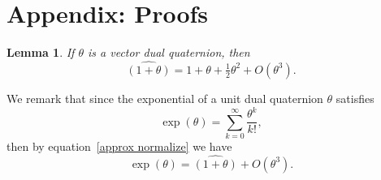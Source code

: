\documentclass[reqno,12pt]{amsart}
\newtheorem{lemma}{Lemma}
\begin{document}
\section{Appendix: Proofs}
\label{sec proofs}

\begin{lemma} 
\label{lemma approx normalize}
If $\theta$ is a vector dual quaternion, then
\begin{equation}
\label{approx normalize}
\widehat {(1+\theta)} = 1 + \theta + \tfrac12 \theta^2 + O(\theta^3).
\end{equation}
\end{lemma}

We remark that since the exponential of a unit dual quaternion $\theta$ \cite{wang-et-al} satisfies
\begin{equation}
\label{exponential}
\exp(\theta) = \sum_{k=0}^\infty \frac{\theta^k}{k!},
\end{equation}
then by equation~\eqref{approx normalize} we have
\begin{equation}
\label{exp-normal}
\exp(\theta) = \widehat{(1+\theta)} + O(\theta^3) .
\end{equation}
\end{document}
